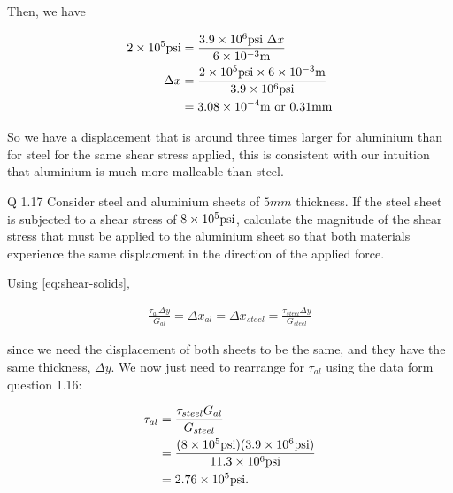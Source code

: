 \begin{solution}
  Then, we have

  \begin{align*}
    2 \times 10^5 \si{psi} &= \frac{ 3.9 \times 10^6 \si{psi} ~ \Delta x }{ 6 \times 10^{-3} \si{m} } \\
    \Delta x &= \frac{ 2 \times 10^{5} \si{psi} \times 6 \x 10^{-3} \si{m} }{ 3.9 \times 10^{6} \si{psi} } \\
    &= 3.08 \x 10^{-4} \si{m} \text{ or } 0.31 \si{mm}
  \end{align*}

  So we have a displacement that is around three times larger for aluminium than for steel for the same shear stress applied, this is consistent with our intuition that aluminium is much more malleable than steel.
\end{solution}


\begin{question}
  Q 1.17 Consider steel and aluminium sheets of $5\si{mm}$ thickness. If the steel sheet is subjected to a shear stress of $8 \x 10^5 \si{psi}$, calculate the magnitude of the shear stress that must be applied to the aluminium sheet so that both materials experience the same displacment in the direction of the applied force.
\end{question}

\begin{solution}
  Using \eqref{eq:shear-solids},

  \begin{align*}
    \frac{ \tau_{al} \Delta y }{ G_{al} } = \Delta x_{al} = \Delta x_{steel} = \frac{ \tau_{steel} \Delta y }{ G_{steel} }
  \end{align*}

  since we need the displacement of both sheets to be the same, and they have the same thickness, $\Delta y$. We now just need to rearrange for $\tau_{al}$ using the data form question 1.16:

  \begin{align*}
    \tau_{al} &= \frac{ \tau_{steel} G_{al} }{ G_{steel} } \\
    &= \frac{ (8 \x 10^5 \si{psi})(3.9 \times 10^{6} \si{psi}) }{ 11.3 \times 10^{6} \si{psi} }\\
    & = 2.76 \x 10^5 \si{psi}.
  \end{align*}
\end{solution}


